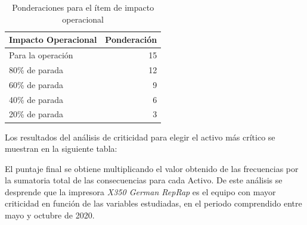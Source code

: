 \begin{table}[H]
  \centering
  
    \begin{tabular}{|l|r|}
    \hline
    Impacto Operacional & \multicolumn{1}{l|}{Ponderación } \\
    \hline
    Para la operación & 15 \\
    \hline
    80\% de parada & 12 \\
    \hline
    60\% de parada & 9 \\
    \hline
    40\% de parada & 6 \\
    \hline
    20\% de parada & 3 \\
    \hline
    \end{tabular}%
    \caption{Ponderaciones para el ítem de impacto operacional}
  \label{tab:addlabel}%
\end{table}%

\clearpage

Los resultados del análisis de criticidad para elegir el activo más crítico se muestran en la siguiente tabla:

\begin{table}[H]
  \centering
  
    \caption{Análisis de criticidad para determinar el activo más crítico.}
  \label{tab:addlabel}%
\end{table}%

El puntaje final se obtiene multiplicando el valor obtenido de las frecuencias por la sumatoria total de las consecuencias para cada Activo. De este análisis se desprende que la impresora \textit{X350 German RepRap} es el equipo con mayor criticidad en función de las variables estudiadas, en el periodo comprendido entre mayo y octubre de 2020.

